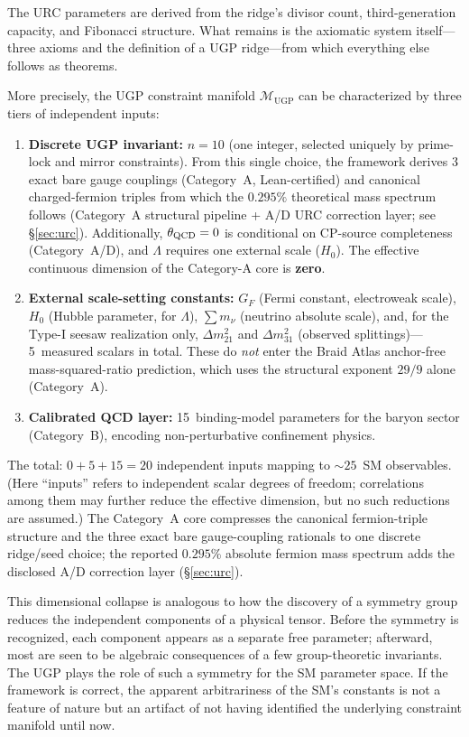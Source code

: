 \documentclass[11pt]{article}
\theoremstyle{remark}
\newcommand{\UGP}{\text{UGP}}
\begin{document}
The URC parameters are derived from the ridge's divisor count, third-generation capacity, and Fibonacci structure.
What remains is the axiomatic system itself---three axioms and the definition of a UGP ridge---from which everything else follows as theorems.

More precisely, the UGP constraint manifold $\mathcal{M}_{\UGP}$ can be characterized by three tiers of independent inputs:
\begin{enumerate}[leftmargin=1.2em,itemsep=0.15em]
\item \textbf{Discrete UGP invariant:} $n{=}10$ (one integer, selected uniquely by prime-lock and mirror constraints). From this single choice, the framework derives 3 exact bare gauge couplings (Category~A, Lean-certified) and canonical charged-fermion triples from which the $0.295\%$ theoretical mass spectrum follows (Category~A structural pipeline + A/D URC correction layer; see \S\ref{sec:urc}). Additionally, $\theta_{\rm QCD} = 0$ is conditional on CP-source completeness (Category~A/D), and $\Lambda$ requires one external scale ($H_0$). The effective continuous dimension of the Category-A core is \textbf{zero}.
\item \textbf{External scale-setting constants:} $G_F$ (Fermi constant, electroweak scale), $H_0$ (Hubble parameter, for $\Lambda$), $\sum m_\nu$ (neutrino absolute scale), and, for the Type-I seesaw realization only, $\Delta m^2_{21}$ and $\Delta m^2_{31}$ (observed splittings)---5~measured scalars in total.  These do \emph{not} enter the Braid Atlas anchor-free mass-squared-ratio prediction, which uses the structural exponent $29/9$ alone (Category~A).
\item \textbf{Calibrated QCD layer:} 15~binding-model parameters for the baryon sector (Category~B), encoding non-perturbative confinement physics.
\end{enumerate}
The total: $0 + 5 + 15 = 20$ independent inputs mapping to $\sim\!25$~SM observables. (Here ``inputs'' refers to independent scalar degrees of freedom; correlations among them may further reduce the effective dimension, but no such reductions are assumed.)
The Category~A core compresses the canonical fermion-triple structure and the three exact bare gauge-coupling rationals to one discrete ridge/seed choice; the reported $0.295\%$ absolute fermion mass spectrum adds the disclosed A/D correction layer (\S\ref{sec:urc}).

This dimensional collapse is analogous to how the discovery of a symmetry group reduces the independent components of a physical tensor.
Before the symmetry is recognized, each component appears as a separate free parameter; afterward, most are seen to be algebraic consequences of a few group-theoretic invariants.
The UGP plays the role of such a symmetry for the SM parameter space.
If the framework is correct, the apparent arbitrariness of the SM's constants is not a feature of nature but an artifact of not having identified the underlying constraint manifold until now.
\end{document}
